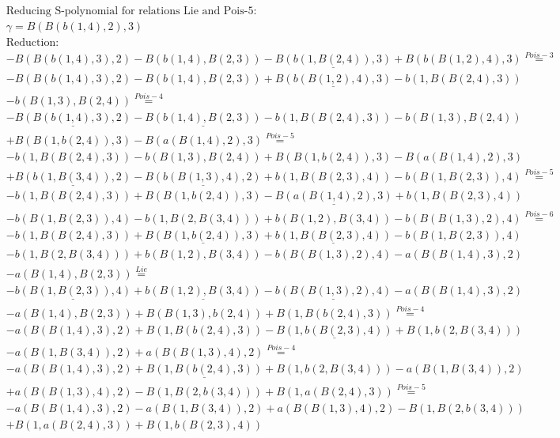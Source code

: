 \documentclass[11pt]{amsart}
\begin{document}
\begin{align*} 
& \text{Reducing S-polynomial for relations Lie and Pois-5:} \\ 
& \gamma = B(B(b(1,4),2),3) \\ 
& \text{Reduction}: \\& - B(B(b(1,4),3),2) - B(b(1,4),B(2,3)) - \underline{B(b(1,B(2,4)),3)} + B(b(B(1,2),4),3) \stackrel{ Pois-3 }{=}  \\ 
& - B(B(b(1,4),3),2) - B(b(1,4),B(2,3)) + \underline{B(b(B(1,2),4),3)} - b(1,B(B(2,4),3))\\ 
 &  - b(B(1,3),B(2,4)) \stackrel{ Pois-4 }{=}  \\ 
& - \underline{B(B(b(1,4),3),2)} - \underline{B(b(1,4),B(2,3))} - b(1,B(B(2,4),3)) - b(B(1,3),B(2,4))\\ 
 &  + B(B(1,b(2,4)),3) - B(a(B(1,4),2),3) \stackrel{ Pois-5 }{=}  \\ 
& - b(1,B(B(2,4),3)) - b(B(1,3),B(2,4)) + B(B(1,b(2,4)),3) - B(a(B(1,4),2),3)\\ 
 &  + \underline{B(b(1,B(3,4)),2)} - \underline{B(b(B(1,3),4),2)} + b(1,B(B(2,3),4)) - b(B(1,B(2,3)),4) \stackrel{ Pois-5 }{=}  \\ 
& - b(1,B(B(2,4),3)) + B(B(1,b(2,4)),3) - \underline{B(a(B(1,4),2),3)} + b(1,B(B(2,3),4))\\ 
 &  - b(B(1,B(2,3)),4) - b(1,B(2,B(3,4))) + b(B(1,2),B(3,4)) - b(B(B(1,3),2),4) \stackrel{ Pois-6 }{=}  \\ 
& - b(1,B(B(2,4),3)) + \underline{B(B(1,b(2,4)),3)} + \underline{b(1,B(B(2,3),4))} - b(B(1,B(2,3)),4)\\ 
 &  - b(1,B(2,B(3,4))) + b(B(1,2),B(3,4)) - b(B(B(1,3),2),4) - a(B(B(1,4),3),2)\\ 
 &  - a(B(1,4),B(2,3)) \stackrel{ Lie }{=}  \\ 
& - \underline{b(B(1,B(2,3)),4)} + \underline{b(B(1,2),B(3,4))} - \underline{b(B(B(1,3),2),4)} - a(B(B(1,4),3),2)\\ 
 &  - a(B(1,4),B(2,3)) + B(B(1,3),b(2,4)) + B(1,B(b(2,4),3)) \stackrel{ Pois-4 }{=}  \\ 
& - a(B(B(1,4),3),2) + B(1,B(b(2,4),3)) - \underline{B(1,b(B(2,3),4))} + B(1,b(2,B(3,4)))\\ 
 &  - a(B(1,B(3,4)),2) + a(B(B(1,3),4),2) \stackrel{ Pois-4 }{=}  \\ 
& - a(B(B(1,4),3),2) + \underline{B(1,B(b(2,4),3))} + B(1,b(2,B(3,4))) - a(B(1,B(3,4)),2)\\ 
 &  + a(B(B(1,3),4),2) - B(1,B(2,b(3,4))) + B(1,a(B(2,4),3)) \stackrel{ Pois-5 }{=}  \\ 
& - a(B(B(1,4),3),2) - a(B(1,B(3,4)),2) + a(B(B(1,3),4),2) - B(1,B(2,b(3,4)))\\ 
 &  + B(1,a(B(2,4),3)) + B(1,b(B(2,3),4))\\ 
\end{align*} 
 
\end{document}
